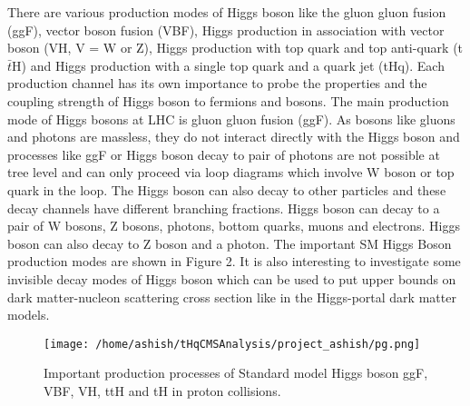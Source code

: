 \documentclass[final,3p]{CSP}
\begin{document}
There are various production modes of Higgs boson like the gluon gluon fusion (ggF), vector boson fusion (VBF), Higgs 
production in association with vector boson (VH, V = W or Z), Higgs production with top quark and top anti-quark (t$\bar{t}$H) and Higgs 
production with a single top quark and a quark jet (tHq). Each production channel has its own importance to probe the 
properties and the coupling strength of Higgs boson to fermions and bosons. The main production mode of Higgs bosons at LHC is 
gluon gluon fusion (ggF). As bosons like gluons and photons are massless, they do not interact directly with the Higgs boson 
and processes like ggF or Higgs boson decay to pair of photons are not possible at tree level and can only proceed via loop 
diagrams which involve W boson or top quark in the loop. The Higgs boson can also decay to other particles and these decay 
channels have different branching fractions. Higgs boson can decay to a pair of W bosons, Z bosons, photons, bottom quarks, 
muons and electrons. Higgs boson can also decay to Z boson and a photon. The important SM Higgs Boson production modes are shown in Figure 2. It is also interesting to investigate some invisible 
decay modes of Higgs boson which can be used to put upper bounds on dark matter-nucleon scattering cross section like in the 
Higgs-portal dark matter models.\\

\begin{figure}
  \centering
   \texttt{[image: /home/ashish/tHqCMSAnalysis/project\_ashish/pg.png]}
  \caption{Important production processes of Standard model Higgs boson ggF, VBF, VH, ttH and tH in proton collisions.}
   \label{figure 2}
\end{figure}
\end{document}
